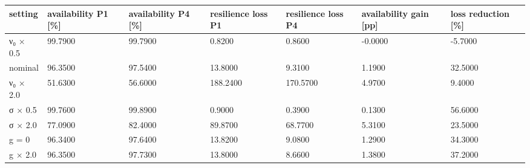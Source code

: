 \begin{tabular}{lllllll}
\toprule
setting & availability P1 [\%] & availability P4 [\%] & resilience loss P1 & resilience loss P4 & availability gain [pp] & loss reduction [\%] \\
\midrule
ν₀ × 0.5 & 99.7900 & 99.7900 & 0.8200 & 0.8600 & -0.0000 & -5.7000 \\
nominal & 96.3500 & 97.5400 & 13.8000 & 9.3100 & 1.1900 & 32.5000 \\
ν₀ × 2.0 & 51.6300 & 56.6000 & 188.2400 & 170.5700 & 4.9700 & 9.4000 \\
σ × 0.5 & 99.7600 & 99.8900 & 0.9000 & 0.3900 & 0.1300 & 56.6000 \\
σ × 2.0 & 77.0900 & 82.4000 & 89.8700 & 68.7700 & 5.3100 & 23.5000 \\
g = 0 & 96.3400 & 97.6400 & 13.8200 & 9.0800 & 1.2900 & 34.3000 \\
g × 2.0 & 96.3500 & 97.7300 & 13.8000 & 8.6600 & 1.3800 & 37.2000 \\
\bottomrule
\end{tabular}
